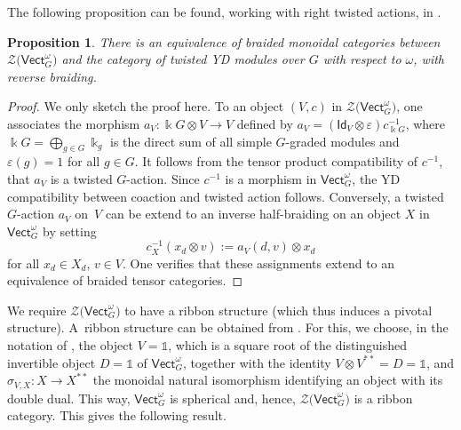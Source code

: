 \documentclass[pdftex]{sigma}
\numberwithin{equation}{section}
\newtheorem{Proposition}[Theorem]{Proposition}
 { \theoremstyle{definition}
\newtheorem{Definition}[Theorem]{Definition}
\newtheorem{Note}[Theorem]{Note}
\newtheorem{Notation}[Theorem]{Notation}
\newtheorem{Example}[Theorem]{Example}
\newtheorem{Remark}[Theorem]{Remark} }
\newcommand{\ide}{\mathsf{Id}}
\newcommand{\one}{\mathds{1}}
\newcommand{\Vect}{\mathsf{Vect}}
\newcommand{\cZ}{\mathcal{Z}}
\begin{document}
The following proposition can be found, working with right twisted actions, in \cite[Section~3]{Maj98}.
\begin{Proposition}\label{prop:twistedYD-ZVect}
There is an equivalence of braided monoidal categories between $\cZ\big(\Vect_G^\omega\big)$ and the category of twisted YD modules over $G$ with respect to $\omega$, with reverse braiding.
\end{Proposition}
\begin{proof}
We only sketch the proof here. To an object $(V,c)$ in $\cZ\big(\Vect_G^\omega\big)$, one associates the morphism $a_V\colon \Bbbk G\otimes V\to V$ defined by $a_V=(\ide_V\otimes \varepsilon)c^{-1}_{\Bbbk G}$, where $\Bbbk G=\bigoplus_{g\in G} \Bbbk_g$ is the direct sum of all simple $G$-graded modules and $\varepsilon(g)=1$ for all $g\in G$. It follows from the tensor product compatibility of $c^{-1}$, that $a_V$ is a twisted $G$-action. Since $c^{-1}$ is a morphism in $\Vect_G^\omega$, the YD compatibility between coaction and twisted action follows. Conversely, a twisted $G$-action $a_V$ on~$V$ can be extend to an inverse half-braiding on an object $X$ in $\Vect_G^\omega$ by setting
\[c^{-1}_X(x_d\otimes v):=a_V(d,v)\otimes x_d \]
for all $x_d\in X_d$, $v\in V$. One verifies that these assignments extend to an equivalence of braided tensor categories.
\end{proof}

We require $\cZ\big(\Vect_G^\omega\big)$ to have a ribbon structure (which thus induces a pivotal structure). A~ribbon structure can be obtained from \cite[Theorem~5.4]{Shi2}. For this, we choose, in the notation of \cite[Section~3.2]{LW2}, the object $V=\one$, which is a square root of the distinguished invertible object $D=\one$ of $\Vect_G^\omega$, together with the identity $V\otimes V^{**}=D=\one$, and $\sigma_{V,X}\colon X\to X^{**}$ the monoidal natural isomorphism identifying an object with its double dual. This way, $\Vect_G^\omega$ is spherical and, hence, $\cZ\big(\Vect_G^\omega\big)$ is a ribbon category. This gives the following result.
\end{document}
